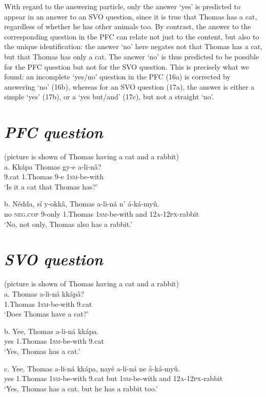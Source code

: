 \documentclass[output=paper]{langsci/langscibook}
\begin{document}
  With regard to the answering particle, only the answer ‘yes’ is predicted to appear in an answer to an SVO question, since it is true that Thomas has a cat, regardless of whether he has other animals too. By contrast, the answer to the corresponding question in the PFC can relate not just to the content, but also to the unique identification: the answer ‘no’ here negates not that Thomas has a cat, but that Thomas has only a cat. The answer ‘no’ is thus predicted to be possible for the PFC question but not for the SVO question. This is precisely what we found: an incomplete ‘yes/no’ question in the PFC (16a) is corrected by answering ‘no’ (16b), whereas for an SVO question (17a), the answer is either a simple ‘yes’ (17b), or a ‘yes but/and’ (17c), but not a straight ‘no’. 

\chapter[PFC question]{\textit{PFC question}}
       (picture is shown of Thomas having a cat and a rabbit)\\
\gll   a.  Kkápa  Thomas  gy-e  a-li-nâ?\\
         9.cat  1.Thomas  9-e  \textsc{1sm}{}-be-with\\
\glt     ‘Is it a cat that Thomas has?’
\z

\gll   b.  Nédda,  sí    y-okkâ,  Thomas  a-li-ná    n’  á-ká-myû.\\
         no  \textsc{neg}.\textsc{cop}  9-only  1.Thomas  \textsc{1sm}{}-be-with  and  \textsc{12a}{}-\textsc{12px}{}-rabbit\\
\glt     ‘No, not only, Thomas also has a rabbit.’
\z

\chapter[SVO question]{\textit{SVO question}}
       (picture is shown of Thomas having a cat and a rabbit)\\
\gll a.  Thomas  a-li-ná  kkápâ?\\
       1.Thomas  \textsc{1sm}{}-be-with  9.cat\\
\glt   ‘Does Thomas have a cat?’
\z

\gll b.  Yee,   Thomas  a-li-ná  kkápa.\\
       yes  1.Thomas  \textsc{1sm}{}-be-with  9.cat\\
\glt   ‘Yes, Thomas has a cat.’
\z

\gll   c.   Yee,  Thomas    a-li-ná    kkápa,  nayé  a-li-ná    ne  á-ká-myû.\\
       yes  1.Thomas  \textsc{1sm}{}-be-with  9.cat   but    \textsc{1sm}{}-be-with  and  \textsc{12a}{}-\textsc{12px}{}-rabbit\\
\glt   ‘Yes, Thomas has a cat, but he has a rabbit too.’
\z
\end{document}
